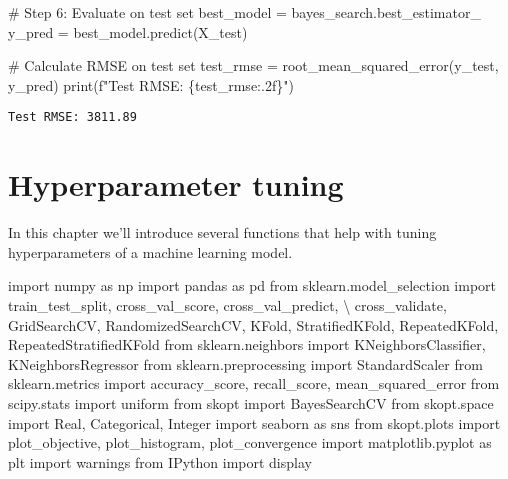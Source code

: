 \documentclass[
  letterpaper,
  DIV=11,
  numbers=noendperiod]{scrreprt}
\newenvironment{Shaded}{\begin{snugshade}}{\end{snugshade}}
\newcommand{\BuiltInTok}[1]{\textcolor[rgb]{0.00,0.23,0.31}{#1}}
\newcommand{\CommentTok}[1]{\textcolor[rgb]{0.37,0.37,0.37}{#1}}
\newcommand{\ImportTok}[1]{\textcolor[rgb]{0.00,0.46,0.62}{#1}}
\newcommand{\NormalTok}[1]{\textcolor[rgb]{0.00,0.23,0.31}{#1}}
\newcommand{\OperatorTok}[1]{\textcolor[rgb]{0.37,0.37,0.37}{#1}}
\newcommand{\SpecialCharTok}[1]{\textcolor[rgb]{0.37,0.37,0.37}{#1}}
\newcommand{\SpecialStringTok}[1]{\textcolor[rgb]{0.13,0.47,0.30}{#1}}
\begin{document}
\begin{Shaded}
\begin{Highlighting}[]
\CommentTok{\# Step 6: Evaluate on test set}
\NormalTok{best\_model }\OperatorTok{=}\NormalTok{ bayes\_search.best\_estimator\_}
\NormalTok{y\_pred }\OperatorTok{=}\NormalTok{ best\_model.predict(X\_test)}

\CommentTok{\# Calculate RMSE on test set}
\NormalTok{test\_rmse }\OperatorTok{=}\NormalTok{ root\_mean\_squared\_error(y\_test, y\_pred)}
\BuiltInTok{print}\NormalTok{(}\SpecialStringTok{f"Test RMSE: }\SpecialCharTok{\{}\NormalTok{test\_rmse}\SpecialCharTok{:.2f\}}\SpecialStringTok{"}\NormalTok{)}
\end{Highlighting}
\end{Shaded}

\begin{verbatim}
Test RMSE: 3811.89
\end{verbatim}

\chapter{Hyperparameter tuning}\label{hyperparameter-tuning-1}

In this chapter we'll introduce several functions that help with tuning
hyperparameters of a machine learning model.

\begin{Shaded}
\begin{Highlighting}[]
\ImportTok{import}\NormalTok{ numpy }\ImportTok{as}\NormalTok{ np}
\ImportTok{import}\NormalTok{ pandas }\ImportTok{as}\NormalTok{ pd}
\ImportTok{from}\NormalTok{ sklearn.model\_selection }\ImportTok{import}\NormalTok{ train\_test\_split, cross\_val\_score, cross\_val\_predict, }\OperatorTok{\textbackslash{}}
\NormalTok{cross\_validate, GridSearchCV, RandomizedSearchCV, KFold, StratifiedKFold, RepeatedKFold, RepeatedStratifiedKFold}
\ImportTok{from}\NormalTok{ sklearn.neighbors }\ImportTok{import}\NormalTok{ KNeighborsClassifier, KNeighborsRegressor}
\ImportTok{from}\NormalTok{ sklearn.preprocessing }\ImportTok{import}\NormalTok{ StandardScaler}
\ImportTok{from}\NormalTok{ sklearn.metrics }\ImportTok{import}\NormalTok{ accuracy\_score, recall\_score, mean\_squared\_error}
\ImportTok{from}\NormalTok{ scipy.stats }\ImportTok{import}\NormalTok{ uniform}
\ImportTok{from}\NormalTok{ skopt }\ImportTok{import}\NormalTok{ BayesSearchCV}
\ImportTok{from}\NormalTok{ skopt.space }\ImportTok{import}\NormalTok{ Real, Categorical, Integer}
\ImportTok{import}\NormalTok{ seaborn }\ImportTok{as}\NormalTok{ sns}
\ImportTok{from}\NormalTok{ skopt.plots }\ImportTok{import}\NormalTok{ plot\_objective, plot\_histogram, plot\_convergence}
\ImportTok{import}\NormalTok{ matplotlib.pyplot }\ImportTok{as}\NormalTok{ plt}
\ImportTok{import}\NormalTok{ warnings}
\ImportTok{from}\NormalTok{ IPython }\ImportTok{import}\NormalTok{ display}
\end{Highlighting}
\end{Shaded}
\end{document}
